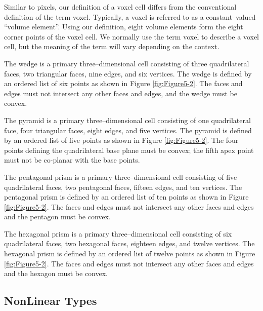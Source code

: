 \begin{description}[leftmargin=0cm,labelindent=0cm]
Similar to pixels, our definition of a voxel cell differs from the conventional definition of the term voxel. Typically, a voxel is referred to as a constant--valued ``volume element''. Using our definition, eight volume elements form the eight corner points of the voxel cell. We normally use the term voxel to describe a voxel cell, but the meaning of the term will vary depending on the context.

\item[Wedge.\index{cell!wedge}] The wedge is a primary three--dimensional cell consisting of three quadrilateral faces, two triangular faces, nine edges, and six vertices. The wedge is defined by an ordered list of six points as shown in Figure \ref{fig:Figure5-2}. The faces and edges must not intersect any other faces and edges, and the wedge must be convex.

\item[Pyramid.\index{cell!pyramid}] The pyramid is a primary three--dimensional cell consisting of one quadrilateral face, four triangular faces, eight edges, and five vertices. The pyramid is defined by an ordered list of five points as shown in Figure \ref{fig:Figure5-2}. The four points defining the quadrilateral base plane must be convex; the fifth apex point must not be co-planar with the base points.

\item[Pentagonal Prism.] The pentagonal prism is a primary three--dimensional cell consisting of five quadrilateral faces, two pentagonal faces, fifteen edges, and ten vertices. The pentagonal prism is defined by an ordered list of ten points as shown in Figure \ref{fig:Figure5-2}. The faces and edges must not intersect any other faces and edges and the pentagon must be convex.

\item[Hexagonal Prism.] The hexagonal prism is a primary three--dimensional cell consisting of six quadrilateral faces, two hexagonal faces, eighteen edges, and twelve vertices. The hexagonal prism is defined by an ordered list of twelve points as shown in Figure \ref{fig:Figure5-2}. The faces and edges must not intersect any other faces and edges and the hexagon must be convex.

\end{description}

\subsection{NonLinear Types}

